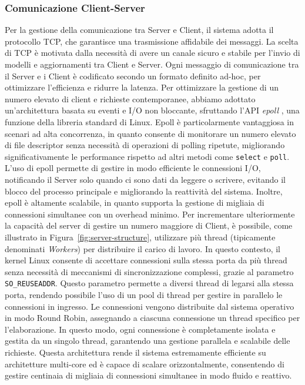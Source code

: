 \documentclass[a4paper, oneside, openright]{report}
\begin{document}
\subsubsection*{Comunicazione Client-Server} 
Per la gestione della comunicazione tra Server e Client, il sistema adotta il protocollo TCP, che garantisce una trasmissione affidabile dei messaggi. La scelta di TCP è motivata dalla necessità di avere un canale sicuro e stabile per l'invio di modelli e aggiornamenti tra Client e Server. Ogni messaggio di comunicazione tra il Server e i Client è codificato secondo un formato definito ad-hoc, per ottimizzare l'efficienza e ridurre la latenza.
Per ottimizzare la gestione di un numero elevato di client e richieste contemporanee, abbiamo adottato un'architettura basata su eventi e I/O non bloccante, sfruttando l'API \textit{epoll} \cite{epoll}, una funzione della libreria standard di Linux. Epoll è particolarmente vantaggiosa in scenari ad alta concorrenza, in quanto consente di monitorare un numero elevato di file descriptor senza necessità di operazioni di polling ripetute, migliorando significativamente le performance rispetto ad altri metodi come \texttt{select} e \texttt{poll}.
L'uso di epoll permette di gestire in modo efficiente le connessioni I/O, notificando il Server solo quando ci sono dati da leggere o scrivere, evitando il blocco del processo principale e migliorando la reattività del sistema. Inoltre, epoll è altamente scalabile, in quanto supporta la gestione di migliaia di connessioni simultanee con un overhead minimo.
Per incrementare ulteriormente la capacità del server di gestire un numero maggiore di Client, è possibile, come illustrato in Figura~\ref{fig:server-structure}, utilizzare più thread (tipicamente denominati \textit{Workers}) per distribuire il carico di lavoro. In questo contesto, il kernel Linux consente di accettare connessioni sulla stessa porta da più thread senza necessità di meccanismi di sincronizzazione complessi, grazie al parametro \texttt{SO\_REUSEADDR}. Questo parametro permette a diversi thread di legarsi alla stessa porta, rendendo possibile l'uso di un pool di thread per gestire in parallelo le connessioni in ingresso. Le connessioni vengono distribuite dal sistema operativo in modo Round Robin, assegnando a ciascuna connessione un thread specifico per l'elaborazione. In questo modo, ogni connessione è completamente isolata e gestita da un singolo thread, garantendo una gestione parallela e scalabile delle richieste.
Questa architettura rende il sistema estremamente efficiente su architetture multi-core ed  è capace di scalare orizzontalmente, consentendo di gestire centinaia di migliaia di connessioni simultanee in modo fluido e reattivo.
\end{document}

